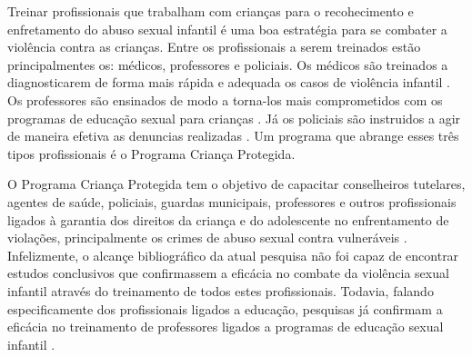 Treinar profissionais que trabalham com crianças para o recohecimento e enfretamento do abuso sexual infantil é uma boa estratégia para se combater a violência contra as crianças. Entre os profissionais a serem treinados estão principalmentes os: médicos, professores e policiais. Os médicos são treinados a diagnosticarem de forma mais rápida e adequada os casos de violência infantil \cite{de2012violencia}. Os professores são ensinados de modo a torna-los mais comprometidos com os programas de educação sexual para crianças \cite{dip2016advancing}. Já os policiais são instruidos a agir de maneira efetiva as denuncias realizadas \cite{pelisoli2010prevenccao}. 
Um programa que abrange esses três tipos profissionais é o Programa Criança Protegida. 

\vspace{-0.1cm}


O Programa Criança Protegida tem o objetivo de capacitar conselheiros tutelares, agentes de saúde, policiais, guardas municipais, professores e outros profissionais ligados à garantia dos direitos da criança e do adolescente no enfrentamento de violações, principalmente os crimes de abuso sexual contra vulneráveis \cite{humanos2019ibero}. Infelizmente, o alcançe bibliográfico da atual pesquisa não foi capaz de encontrar estudos conclusivos que confirmassem a eficácia no combate da violência sexual infantil através do treinamento de todos estes profissionais. Todavia, falando especificamente dos profissionais ligados a educação, pesquisas já confirmam a eficácia no treinamento de professores ligados a programas de educação sexual infantil \cite{dip2016advancing}. 







